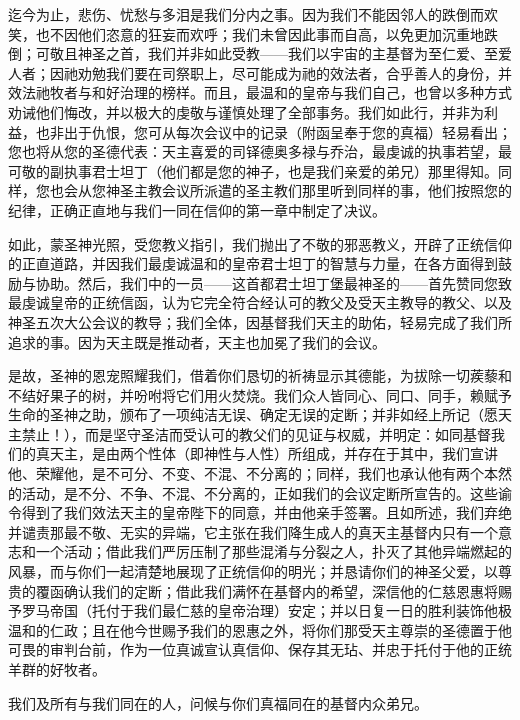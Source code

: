 迄今为止，悲伤、忧愁与多泪是我们分内之事。因为我们不能因邻人的跌倒而欢笑，也不因他们恣意的狂妄而欢呼；我们未曾因此事而自高，以免更加沉重地跌倒；可敬且神圣之首，我们并非如此受教——我们以宇宙的主基督为至仁爱、至爱人者；因祂劝勉我们要在司祭职上，尽可能成为祂的效法者，合乎善人的身份，并效法祂牧者与和好治理的榜样。而且，最温和的皇帝与我们自己，也曾以多种方式劝诫他们悔改，并以极大的虔敬与谨慎处理了全部事务。我们如此行，并非为利益，也非出于仇恨，您可从每次会议中的记录（附函呈奉于您的真福）轻易看出；您也将从您的圣德代表：天主喜爱的司铎德奥多禄与乔治，最虔诚的执事若望，最可敬的副执事君士坦丁（他们都是您的神子，也是我们亲爱的弟兄）那里得知。同样，您也会从您神圣主教会议所派遣的圣主教们那里听到同样的事，他们按照您的纪律，正确正直地与我们一同在信仰的第一章中制定了决议。\par

如此，蒙圣神光照，受您教义指引，我们抛出了不敬的邪恶教义，开辟了正统信仰的正直道路，并因我们最虔诚温和的皇帝君士坦丁的智慧与力量，在各方面得到鼓励与协助。然后，我们中的一员——这首都君士坦丁堡最神圣的——首先赞同您致最虔诚皇帝的正统信函，认为它完全符合经认可的教父及受天主教导的教父、以及神圣五次大公会议的教导；我们全体，因基督我们天主的助佑，轻易完成了我们所追求的事。因为天主既是推动者，天主也加冕了我们的会议。\par

是故，圣神的恩宠照耀我们，借着你们恳切的祈祷显示其德能，为拔除一切蒺藜和不结好果子的树，并吩咐将它们用火焚烧。我们众人皆同心、同口、同手，赖赋予生命的圣神之助，颁布了一项纯洁无误、确定无误的定断；并非如经上所记（愿天主禁止！），而是坚守圣洁而受认可的教父们的见证与权威，并明定：如同基督我们的真天主，是由两个性体（即神性与人性）所组成，并存在于其中，我们宣讲他、荣耀他，是不可分、不变、不混、不分离的；同样，我们也承认他有两个本然的活动，是不分、不争、不混、不分离的，正如我们的会议定断所宣告的。这些谕令得到了我们效法天主的皇帝陛下的同意，并由他亲手签署。且如所述，我们弃绝并谴责那最不敬、无实的异端，它主张在我们降生成人的真天主基督内只有一个意志和一个活动；借此我们严厉压制了那些混淆与分裂之人，扑灭了其他异端燃起的风暴，而与你们一起清楚地展现了正统信仰的明光；并恳请你们的神圣父爱，以尊贵的覆函确认我们的定断；借此我们满怀在基督内的希望，深信他的仁慈恩惠将赐予罗马帝国（托付于我们最仁慈的皇帝治理）安定；并以日复一日的胜利装饰他极温和的仁政；且在他今世赐予我们的恩惠之外，将你们那受天主尊崇的圣德置于他可畏的审判台前，作为一位真诚宣认真信仰、保存其无玷、并忠于托付于他的正统羊群的好牧者。\par

我们及所有与我们同在的人，问候与你们真福同在的基督内众弟兄。\par

